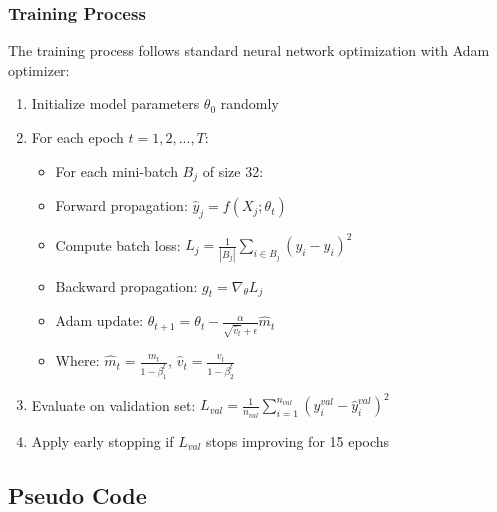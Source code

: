 \documentclass[12pt,a4paper]{article}
\begin{document}
\subsubsection{Training Process}
The training process follows standard neural network optimization with Adam optimizer:
\begin{enumerate}
    \item Initialize model parameters $\theta_0$ randomly
    \item For each epoch $t = 1, 2, ..., T$:
    \begin{itemize}
        \item For each mini-batch $B_j$ of size 32:
        \item Forward propagation: $\hat{y}_j = f(X_j; \theta_t)$
        \item Compute batch loss: $L_j = \frac{1}{|B_j|}\sum_{i \in B_j}(y_i - \hat{y}_i)^2$
        \item Backward propagation: $g_t = \nabla_\theta L_j$
        \item Adam update: $\theta_{t+1} = \theta_t - \frac{\alpha}{\sqrt{\hat{v}_t} + \epsilon} \hat{m}_t$
        \item Where: $\hat{m}_t = \frac{m_t}{1-\beta_1^t}$, $\hat{v}_t = \frac{v_t}{1-\beta_2^t}$
    \end{itemize}
    \item Evaluate on validation set: $L_{val} = \frac{1}{n_{val}}\sum_{i=1}^{n_{val}}(y_i^{val} - \hat{y}_i^{val})^2$
    \item Apply early stopping if $L_{val}$ stops improving for 15 epochs
\end{enumerate}

\subsection{Pseudo Code}
\end{document}
